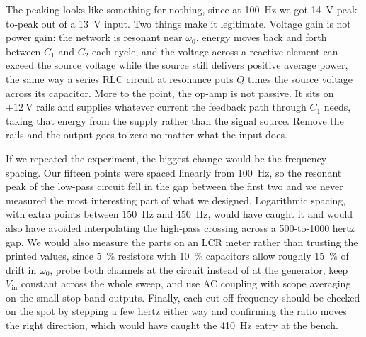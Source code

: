 \documentclass[11pt]{article}
\begin{document}
The peaking looks like something for nothing, since at \qty{100}{\hertz} we got
\qty{14}{\volt} peak-to-peak out of a \qty{13}{\volt} input. Two things make it
legitimate. Voltage gain is not power gain: the network is resonant near
$\omega_0$, energy moves back and forth between $C_1$ and $C_2$ each cycle, and the
voltage across a reactive element can exceed the source voltage while the source
still delivers positive average power, the same way a series RLC circuit at
resonance puts $Q$ times the source voltage across its capacitor. More to the
point, the op-amp is not passive. It sits on $\pm\qty{12}{\volt}$ rails and
supplies whatever current the feedback path through $C_1$ needs, taking that
energy from the supply rather than the signal source. Remove the rails and the
output goes to zero no matter what the input does.

If we repeated the experiment, the biggest change would be the frequency spacing.
Our fifteen points were spaced linearly from \qty{100}{\hertz}, so the resonant
peak of the low-pass circuit fell in the gap between the first two and we never
measured the most interesting part of what we designed. Logarithmic spacing, with
extra points between \qty{150}{\hertz} and \qty{450}{\hertz}, would have caught it
and would also have avoided interpolating the high-pass crossing across a
500-to-1000 hertz gap. We would also measure the parts on an LCR meter rather than
trusting the printed values, since \qty{5}{\percent} resistors with
\qty{10}{\percent} capacitors allow roughly \qty{15}{\percent} of drift in
$\omega_0$, probe both channels at the circuit instead of at the generator, keep
$V_{\text{in}}$ constant across the whole sweep, and use AC coupling with scope
averaging on the small stop-band outputs. Finally, each cut-off frequency should
be checked on the spot by stepping a few hertz either way and confirming the ratio
moves the right direction, which would have caught the \qty{410}{\hertz} entry at
the bench.

\end{document}
